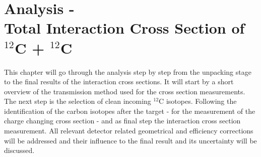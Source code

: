\section{Analysis - \\Total Interaction Cross Section of  $^{12}$C + $^{12}$C}\label{sec:analysis_cross_sec}
This chapter will go through the  analysis step by step from the unpacking stage to the final results of the interaction cross sections. It will start by a short overview of the transmission method used for the cross section measurements. The next step is  the selection of clean incoming $^{12}$C isotopes. Following the identification of the carbon isotopes after the target - for the measurement of the charge changing cross section - and as final step the interaction cross section measurement. \newline
All relevant detector related geometrical and efficiency corrections will be addressed and their influence to the final result and its uncertainty will be discussed.
